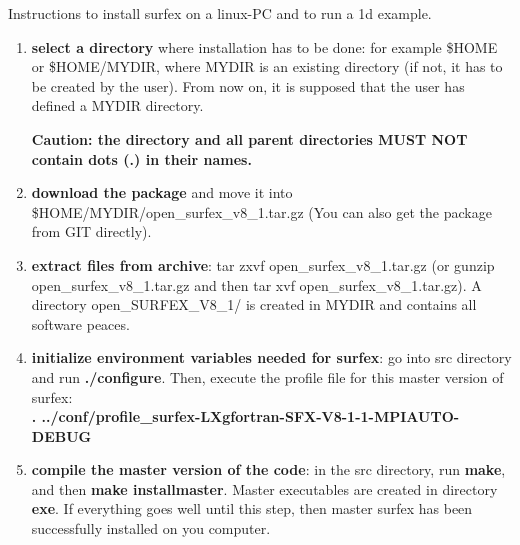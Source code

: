 Instructions to install surfex on a linux-PC and to run a 1d example.

\begin{enumerate}
	\item {\bf{select a directory}} where installation has to be done: for example \$HOME or \$HOME/MYDIR, where MYDIR is an existing directory (if not, it has to be created by the user). From now on, it is supposed that the user has defined a MYDIR directory.

		{\bf{Caution: the directory and all parent directories MUST NOT contain dots (.) in their names.}}
	\item {\bf{download the package}} and move it into \$HOME/MYDIR/open\_surfex\_v8\_1.tar.gz (You can also get the package from GIT directly).

	\item {\bf{extract files from archive}}: tar zxvf open\_surfex\_v8\_1.tar.gz (or gunzip open\_surfex\_v8\_1.tar.gz and then tar xvf open\_surfex\_v8\_1.tar.gz). A directory open\_SURFEX\_V8\_1/ is created in MYDIR and contains all software peaces.

	\item {\bf{initialize environment variables needed for surfex}}:
		go into src directory and run {\bf{./configure}}.
Then, execute the profile file for this master version of surfex: \\
		{\bf{. ../conf/profile\_surfex-LXgfortran-SFX-V8-1-1-MPIAUTO-DEBUG}}

	\item {\bf{compile the master version of the code}}:
		in the src directory, run {\bf{make}}, and then {\bf{make installmaster}}.
		Master executables are created in directory {\bf{exe}}.
If everything goes well until this step, then master surfex has been successfully installed on
you computer.


\end{enumerate}

